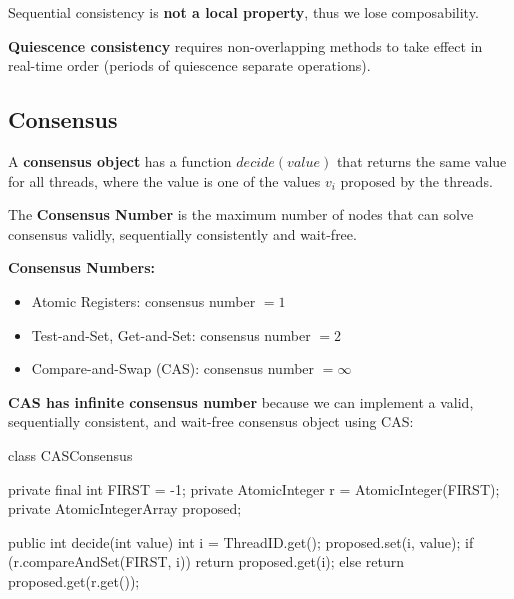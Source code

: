 \begin{theorem}
Sequential consistency is \textbf{not a local property}, thus we lose composability.
\end{theorem}

\begin{remark}
\textbf{Quiescence consistency} requires non-overlapping methods to take effect in real-time order (periods of quiescence separate operations).
\end{remark}

\subsection{Consensus}

\begin{definition}
A \textbf{consensus object} has a function $decide(value)$ that returns the same value for all threads, where the value is one of the values $v_i$ proposed by the threads.
\end{definition}

\begin{definition}
The \textbf{Consensus Number} is the maximum number of nodes that can solve consensus validly, sequentially consistently and wait-free.
\end{definition}

\begin{theorem}
\textbf{Consensus Numbers:}
\begin{itemize}
    \item Atomic Registers: consensus number $= 1$
    \item Test-and-Set, Get-and-Set: consensus number $= 2$
    \item Compare-and-Swap (CAS): consensus number $= \infty$
\end{itemize}
\end{theorem}

\begin{remark}
\textbf{CAS has infinite consensus number} because we can implement a valid, sequentially consistent, and wait-free consensus object using CAS:
\end{remark}

\begin{codeexample}
class CASConsensus {
    private final int FIRST = -1;
    private AtomicInteger r = AtomicInteger(FIRST);
    private AtomicIntegerArray proposed;

    public int decide(int value) {
        int i = ThreadID.get();
        proposed.set(i, value);
        if (r.compareAndSet(FIRST, i)) {
            return proposed.get(i);
        } else {
            return proposed.get(r.get());
        }
    }
}
\end{codeexample}


